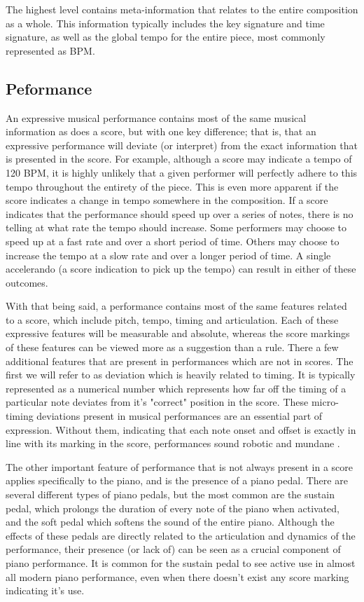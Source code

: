 The highest level contains meta-information that relates to the entire composition as a whole. This information typically includes the key signature and time signature, as well as the global tempo for the entire piece, most commonly represented as BPM. 

\subsection{Peformance}\label{sec:performance}
An expressive musical performance contains most of the same musical information as does a score, but with one key difference; that is, that an expressive performance will deviate (or interpret) from the exact information that is presented in the score. For example, although a score may indicate a tempo of 120 BPM, it is highly unlikely that a given performer will perfectly adhere to this tempo throughout the entirety of the piece. This is even more apparent if the score indicates a change in tempo somewhere in the composition. If a score indicates that the performance should speed up over a series of notes, there is no telling at what rate the tempo should increase. Some performers may choose to speed up at a fast rate and over a short period of time. Others may choose to increase the tempo at a slow rate and over a longer period of time. A single accelerando (a score indication to pick up the tempo) can result in either of these outcomes. 

With that being said, a performance contains most of the same features related to a score, which include pitch, tempo, timing and articulation. Each of these expressive features will be measurable and absolute, whereas the score markings of these features can be viewed more as a suggestion than a rule. There a few additional features that are present in performances which are not in scores. The first we will refer to as deviation which is heavily related to timing. It is typically represented as a numerical number which represents how far off the timing of a particular note deviates from it's "correct" position in the score. These micro-timing deviations present in musical performances are an essential part of expression. Without them, indicating that each note onset and offset is exactly in line with its marking in the score, performances sound robotic and mundane . 

The other important feature of performance that is not always present in a score applies specifically to the piano, and is the presence of a piano pedal. There are several different types of piano pedals, but the most common are the sustain pedal, which prolongs the duration of every note of the piano when activated, and the soft pedal which softens the sound of the entire piano. Although the effects of these pedals are directly related to the articulation and dynamics of the performance, their presence (or lack of) can be seen as a crucial component of piano performance. It is common for the sustain pedal to see active use in almost all modern piano performance, even when there doesn't exist any score marking indicating it's use. 

